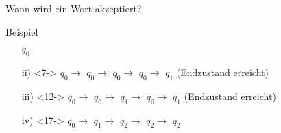 \begin{frame}{Wann wird ein Wort akzeptiert?}
\begin{alertblock}{Beispiel}
\begin{center}
\begin{enumerate}
                	\alert<6|handout:0>{$q_0$} 
                \item[ii)]<7-> 
                	\alert<7|handout:0>{$q_0 \rightarrow$} 
	                \alert<8|handout:0>{$q_0 \rightarrow$} 
	                \alert<9|handout:0>{$q_0 \rightarrow$} 
	                \alert<10|handout:0>{$q_0 \rightarrow$} 
	                \alert<11|handout:0>{$q_1$} (Endzustand erreicht)
                \item[iii)]<12-> 
                	\alert<12|handout:0>{$q_0 \rightarrow$} 
	                \alert<13|handout:0>{$q_0 \rightarrow$} 
	                \alert<14|handout:0>{$q_1 \rightarrow$} 
	                \alert<15|handout:0>{$q_0 \rightarrow$} 
	              	\alert<16|handout:0>{$q_1$} (Endzustand erreicht)
                \item[iv)]<17-> 
                	\alert<17|handout:0>{$q_0 \rightarrow$} 
	                \alert<18|handout:0>{$q_1 \rightarrow$} 
	                \alert<19|handout:0>{$q_2 \rightarrow$} 
	                \alert<20|handout:0>{$q_2 \rightarrow$} 
	                \alert<21|handout:0>{$q_2$} 
            \end{enumerate}
        \end{center}
    \end{alertblock}
\end{frame}